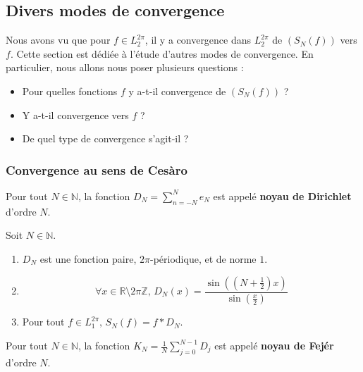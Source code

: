   \subsection{Divers modes de convergence}


  Nous avons vu que pour $f \in L_2^{2\pi}$, il y a convergence dans $L_2^{2\pi}$ de $(S_N(f))$ vers $f$. Cette section est dédiée à l'étude d'autres modes de convergence. En particulier, nous allons nous poser plusieurs questions :

  \begin{itemize}
    \item Pour quelles fonctions $f$ y a-t-il convergence de $(S_N(f))$ ?
    \item Y a-t-il convergence vers $f$ ?
    \item De quel type de convergence s'agit-il ?
  \end{itemize}

  \subsubsection{Convergence au sens de Cesàro}


  \begin{definition}
    Pour tout $N \in \mathbb{N}$, la fonction $D_N = \sum_{n=-N}^{N} e_N$ est appelé \textbf{noyau de Dirichlet} d'ordre $N$.
  \end{definition}

  \begin{proposition}
    Soit $N \in \mathbb{N}$.
    \begin{enumerate}[label=(\roman*)]
      \item $D_N$ est une fonction paire, $2\pi$-périodique, et de norme $1$.
      \item \[ \forall x \in \mathbb{R} \setminus 2 \pi \mathbb{Z}, \, D_N(x) = \frac{\sin \left(\left( N + \frac{1}{2} \right) x \right)}{\sin \left( \frac{x}{2} \right)} \]
      \item Pour tout $f \in L_1^{2 \pi}, \, S_N(f) = f * D_N$.
    \end{enumerate}
  \end{proposition}

  \begin{definition}
    Pour tout $N \in \mathbb{N}$, la fonction $K_N = \frac{1}{N} \sum_{j=0}^{N-1} D_j$ est appelé \textbf{noyau de Fejér} d'ordre $N$.
  \end{definition}

